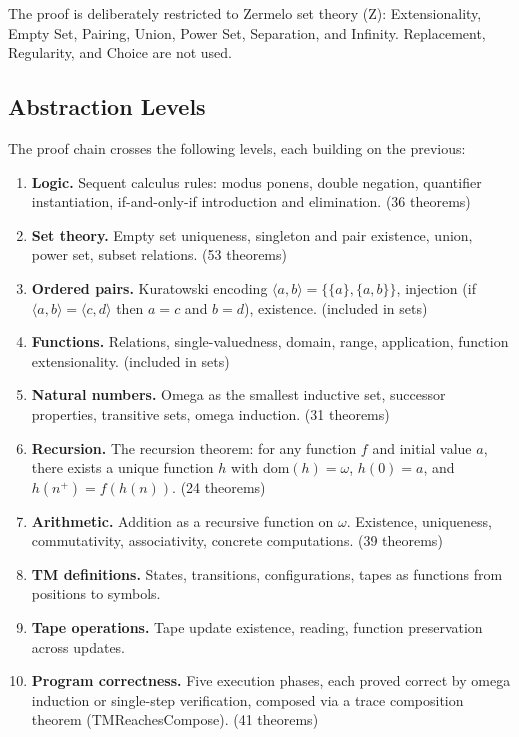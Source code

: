 \documentclass[letterpaper]{article}
\begin{document}
The proof is deliberately restricted to Zermelo set theory (Z):
Extensionality, Empty Set, Pairing, Union, Power Set, Separation, and
Infinity. Replacement, Regularity, and Choice are not used.

\subsection{Abstraction Levels}

The proof chain crosses the following levels, each building on the previous:

\begin{enumerate}
  \item \textbf{Logic.} Sequent calculus rules: modus ponens, double negation,
    quantifier instantiation, if-and-only-if introduction and elimination.
    (36 theorems)
  \item \textbf{Set theory.} Empty set uniqueness, singleton and pair
    existence, union, power set, subset relations.
    (53 theorems)
  \item \textbf{Ordered pairs.} Kuratowski encoding $\langle a,b \rangle =
    \{\{a\},\{a,b\}\}$, injection (if $\langle a,b \rangle = \langle c,d
    \rangle$ then $a=c$ and $b=d$), existence. (included in sets)
  \item \textbf{Functions.} Relations, single-valuedness, domain, range,
    application, function extensionality. (included in sets)
  \item \textbf{Natural numbers.} Omega as the smallest inductive set,
    successor properties, transitive sets, omega induction.
    (31 theorems)
  \item \textbf{Recursion.} The recursion theorem: for any function $f$ and
    initial value $a$, there exists a unique function $h$ with $\text{dom}(h)
    = \omega$, $h(0) = a$, and $h(n^+) = f(h(n))$.
    (24 theorems)
  \item \textbf{Arithmetic.} Addition as a recursive function on $\omega$.
    Existence, uniqueness, commutativity, associativity, concrete computations.
    (39 theorems)
  \item \textbf{TM definitions.} States, transitions, configurations, tapes
    as functions from positions to symbols.
  \item \textbf{Tape operations.} Tape update existence, reading, function
    preservation across updates.
  \item \textbf{Program correctness.} Five execution phases, each proved
    correct by omega induction or single-step verification, composed via a
    trace composition theorem (TMReachesCompose).
    (41 theorems)
\end{enumerate}
\end{document}
